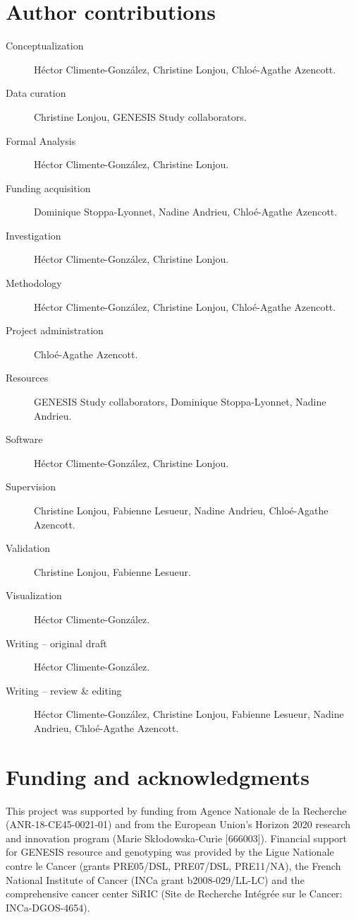 \documentclass[10pt,letterpaper]{article}
\begin{document}
\section*{Author contributions}

\begin{description}
  \item[Conceptualization] Héctor Climente-González, Christine Lonjou, Chloé-Agathe Azencott.
  \item[Data curation] Christine Lonjou, GENESIS Study collaborators.
  \item[Formal Analysis] Héctor Climente-González, Christine Lonjou.
  \item[Funding acquisition] Dominique Stoppa-Lyonnet, Nadine Andrieu, Chloé-Agathe Azencott.
  \item[Investigation] Héctor Climente-González, Christine Lonjou.
  \item[Methodology] Héctor Climente-González, Christine Lonjou, Chloé-Agathe Azencott.
  \item[Project administration] Chloé-Agathe Azencott.
  \item[Resources] GENESIS Study collaborators, Dominique Stoppa-Lyonnet, Nadine Andrieu.
  \item[Software] Héctor Climente-González, Christine Lonjou.
  \item[Supervision] Christine Lonjou, Fabienne Lesueur, Nadine Andrieu, Chloé-Agathe Azencott.
  \item[Validation] Christine Lonjou, Fabienne Lesueur.
  \item[Visualization] Héctor Climente-González.
  \item[Writing – original draft] Héctor Climente-González.
  \item[Writing – review \& editing] Héctor Climente-González, Christine Lonjou, Fabienne Lesueur, Nadine Andrieu, Chloé-Agathe Azencott.
\end{description}

\section*{Funding and acknowledgments}

This project was supported by funding from Agence Nationale de la Recherche (ANR-18-CE45-0021-01) and from the European Union’s Horizon 2020 research and innovation program (Marie Skłodowska-Curie [666003]). Financial support for GENESIS resource and genotyping was provided by the Ligue Nationale contre le Cancer (grants PRE05/DSL, PRE07/DSL, PRE11/NA), the French National Institute of Cancer (INCa grant b2008-029/LL-LC) and the comprehensive cancer center SiRIC (Site de Recherche Intégrée sur le Cancer: INCa-DGOS-4654).
\end{document}
